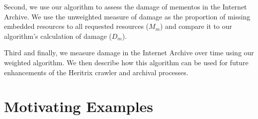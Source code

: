 Second, we use our algorithm to assess the damage of mementos in the Internet Archive. We use the unweighted measure of damage as the proportion of missing embedded resources to all requested resources ($M_m$) and compare it to our algorithm's calculation of damage ($D_m$). %

Third and finally, we measure damage in the Internet Archive over time using our weighted algorithm. We then describe how this algorithm can be used for future enhancements of the Heritrix crawler \cite{Sigurosson:Incremental-Heritrix, heritrix} and archival processes.



\section{Motivating Examples}
\label{example}


